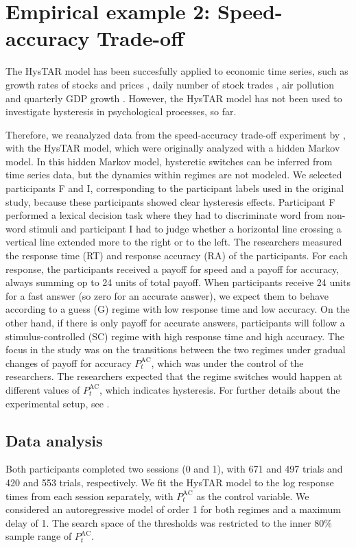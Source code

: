 \documentclass{article}
\begin{document}
\section{Empirical example 2: Speed-accuracy Trade-off} \label{sec:empirical_example_2}
The HysTAR model has been succesfully applied to economic time series, such as growth rates of stocks and prices \citep{tsay}, daily number of stock trades \citep{liu}, air pollution \citep{chen} and quarterly GDP growth \citep{bar2}. However, the HysTAR model has not been used to investigate hysteresis in psychological processes, so far.

Therefore, we reanalyzed data from the speed-accuracy trade-off experiment by \citet[][experiment 1b]{speedaccuracy}, with the HysTAR model, which were originally analyzed with a hidden Markov model.
In this hidden Markov model, hysteretic switches can be inferred from time series data, but the dynamics within regimes are not modeled.
We selected participants F and I, corresponding to the participant labels used in the original study, because these participants showed clear hysteresis effects.
Participant F performed a lexical decision task where they had to discriminate word from non-word stimuli and participant I had to judge whether a horizontal line crossing a vertical line extended more to the right or to the left.
The researchers measured the response time (RT) and response accuracy (RA) of the participants.
For each response, the participants received a payoff for speed and a payoff for accuracy, always summing op to 24 units of total payoff.
When participants receive 24 units for a fast answer (so zero for an accurate answer), we expect them to behave according to a guess (G) regime with low response time and low accuracy.
On the other hand, if there is only payoff for accurate answers, participants will follow a stimulus-controlled (SC) regime with high response time and high accuracy.
The focus in the study was on the transitions between the two regimes under gradual changes of payoff for accuracy $P^{\mathrm{AC}}_t$, which was under the control of the researchers.
The researchers expected that the regime switches would happen at different values of $P^{\mathrm{AC}}_t$, which indicates hysteresis.
For further details about the experimental setup, see \citet{speedaccuracy}.

\subsection{Data analysis}
Both participants completed two sessions (0 and 1), with 671 and 497 trials and 420 and 553 trials, respectively.
We fit the HysTAR model to the log response times from each session separately, with $P^{\mathrm{AC}}_t$ as the control variable. 
We considered an autoregressive model of order 1 for both regimes and a maximum delay of 1.
The search space of the thresholds was restricted to the inner 80\% sample range of $P^{\mathrm{AC}}_t$.
\end{document}
